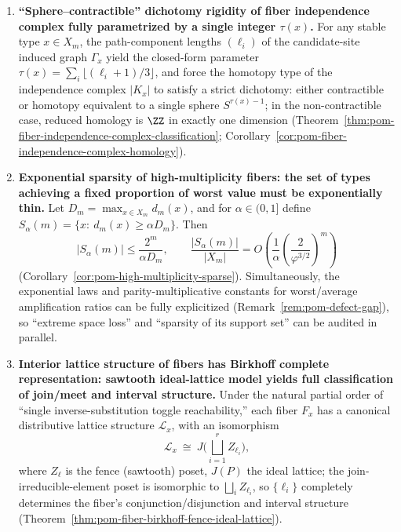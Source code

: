 \begin{enumerate}
  \item \textbf{``Sphere--contractible'' dichotomy rigidity of fiber independence complex fully parametrized by a single integer \texorpdfstring{$\tau(x)$}{tau(x)}.}
  For any stable type \(x\in X_m\), the path-component lengths \((\ell_i)\) of the candidate-site induced graph \(\Gamma_x\) yield the closed-form parameter
  \(\tau(x)=\sum_i\lfloor(\ell_i+1)/3\rfloor\), and force the homotopy type of the independence complex \(|K_x|\) to satisfy a strict dichotomy: either contractible or homotopy equivalent to a single sphere \(S^{\tau(x)-1}\); in the non-contractible case, reduced homology is \(\ZZ\) in exactly one dimension (Theorem~\ref{thm:pom-fiber-independence-complex-classification}; Corollary~\ref{cor:pom-fiber-independence-complex-homology}).

  \item \textbf{Exponential sparsity of high-multiplicity fibers: the set of types achieving a fixed proportion of worst value must be exponentially thin.}
  Let \(D_m=\max_{x\in X_m}d_m(x)\), and for \(\alpha\in(0,1]\) define
  \(S_\alpha(m)=\{x:\ d_m(x)\ge \alpha D_m\}\).
  Then
  \[
  |S_\alpha(m)|\le \frac{2^m}{\alpha D_m},
  \qquad
  \frac{|S_\alpha(m)|}{|X_m|}=O\!\left(\frac{1}{\alpha}\left(\frac{2}{\varphi^{3/2}}\right)^m\right)
  \]
  (Corollary~\ref{cor:pom-high-multiplicity-sparse}).
  Simultaneously, the exponential laws and parity-multiplicative constants for worst/average amplification ratios can be fully explicitized (Remark~\ref{rem:pom-defect-gap}), so ``extreme space loss'' and ``sparsity of its support set'' can be audited in parallel.

  \item \textbf{Interior lattice structure of fibers has Birkhoff complete representation: sawtooth ideal-lattice model yields full classification of join/meet and interval structure.}
  Under the natural partial order of ``single inverse-substitution toggle reachability,'' each fiber \(F_x\) has a canonical distributive lattice structure \(\mathcal L_x\), with an isomorphism
  \[
  \mathcal L_x\ \cong\ J\!\Big(\bigsqcup_{i=1}^r Z_{\ell_i}\Big),
  \]
  where \(Z_{\ell}\) is the fence (sawtooth) poset, \(J(P)\) the ideal lattice; the join-irreducible-element poset is isomorphic to \(\bigsqcup_i Z_{\ell_i}\), so \(\{\ell_i\}\) completely determines the fiber's conjunction/disjunction and interval structure (Theorem~\ref{thm:pom-fiber-birkhoff-fence-ideal-lattice}).


\end{enumerate}
